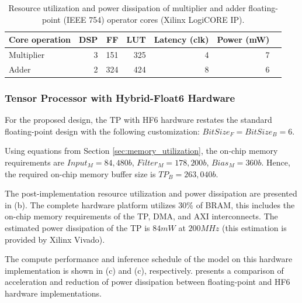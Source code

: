 \begin{table}[!h]\centering
	\caption{Resource utilization and power dissipation of multiplier and adder floating-point (IEEE 754) operator cores (Xilinx LogiCORE IP).}\label{tab:LogiCORE}
	\scriptsize
	\begin{tabular}{lrrrrrr}\toprule
		\textbf{Core operation} &\textbf{DSP} &\textbf{FF} &\textbf{LUT} &\textbf{Latency (clk)} &\textbf{Power (mW)} \\\midrule
		Multiplier &3 &151 &325 &4 &7 \\
		Adder &2 &324 &424 &8 &6 \\
		\bottomrule
	\end{tabular}
\end{table}



\subsubsection{Tensor Processor with Hybrid-Float6 Hardware}
For the proposed design, the TP with HF6 hardware restates the standard floating-point design with the following customization: $BitSize_F=BitSize_B=6$.

Using equations from Section \ref{sec:memory_utilization}, the on-chip memory requirements are $Input_M=84,480b$, $Filter_M=178,200b$, $Bias_M=360b$. Hence, the required on-chip memory buffer size is $TP_B=263,040b$.

The post-implementation resource utilization and power dissipation are presented in (b). The complete hardware platform utilizes 30\% of BRAM, this includes the on-chip memory requirements of the TP, DMA, and AXI interconnects. The estimated power dissipation of the TP is $84mW$ at $200MHz$ (this estimation is provided by Xilinx Vivado).

The compute performance and inference schedule of the model on this hardware implementation is shown in (c) and (c), respectively.  presents a comparison of acceleration and reduction of power dissipation between floating-point and HF6 hardware implementations.


